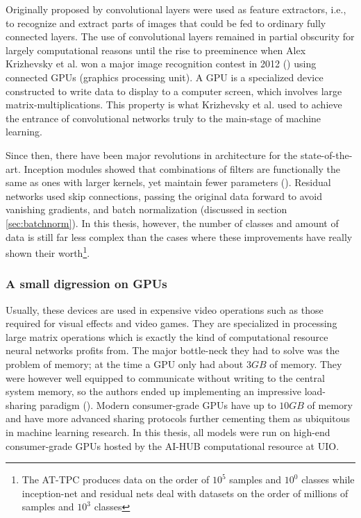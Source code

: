 Originally proposed by \citet{Lecun1998} convolutional layers were used as feature extractors, i.e., to recognize and extract parts of images that could be fed to ordinary fully connected layers. The use of convolutional layers remained in partial obscurity for largely computational reasons until the rise to preeminence when Alex Krizhevsky et al. won a major image recognition contest in 2012 (\cite{Krizhevsky2012}) using connected GPUs (graphics processing unit). A GPU is a specialized device constructed to write data to display to a computer screen, which involves large matrix-multiplications. This property is what Krizhevsky et al. used to achieve the entrance of convolutional networks truly to the main-stage of machine learning. 

Since then, there have been major revolutions in architecture for the state-of-the-art. Inception modules showed that combinations of filters are functionally the same as ones with larger kernels, yet maintain fewer parameters (\cite{Szegedy2014}). Residual networks used skip connections, passing the original data forward to avoid vanishing gradients, and batch normalization (discussed in section \ref{sec:batchnorm}). In this thesis, however, the number of classes and amount of data is still far less complex than the cases where these improvements have really shown their worth\footnote{The AT-TPC produces data on the order of $10^5$ samples and $10^0$ classes while inception-net and residual nets deal with datasets on the order of millions of samples and $10^3$ classes}.

\subsubsection{A small digression on GPUs}
Usually, these devices are used in expensive video operations such as those required for visual effects and video games. They are specialized in processing large matrix operations which is exactly the kind of computational resource neural networks profits from. The major bottle-neck they had to solve was the problem of memory; at the time a GPU only had about $3 GB$ of memory. They were however well equipped to communicate without writing to the central system memory, so the authors ended up implementing an impressive load-sharing paradigm (\cite{Krizhevsky2012}). Modern consumer-grade GPUs have up to $10 GB$ of memory and have more advanced sharing protocols further cementing them as ubiquitous in machine learning research. In this thesis, all models were run on high-end consumer-grade GPUs hosted by the AI-HUB computational resource at UIO.
